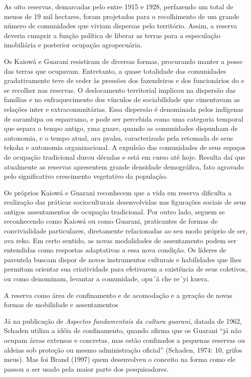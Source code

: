 As oito reservas, demarcadas pelo  entre 1915 e 1928, perfazendo um
total de menos de 19 mil hectares, foram projetadas para o recolhimento
de um grande número de comunidades que viviam dispersas pelo
território. Assim, a reserva deveria cumprir a função política de
liberar as terras para a especulação imobiliária e posterior ocupação
agropecuária. 

Os Kaiowá e Guarani resistiram de diversas formas, procurando manter a
posse das terras que ocupavam. Entretanto, a quase totalidade das
comunidades gradativamente teve de ceder às pressões dos fazendeiros e
dos funcionários do  e se recolher nas reservas. O deslocamento
territorial implicou na dispersão das famílias e no enfraquecimento dos
vínculos de sociabilidade que cimentavam as relações inter e
extracomunitárias. Essa dispersão é denominada pelos indígenas de
sarambipa ou esparramo, e pode ser percebida como uma categoria
temporal que separa o tempo antigo, yma guare, quando as comunidades
dispunham de autonomia, e o tempo atual, ara pyahu, caracterizado pela
retomada de seus tekoha e autonomia organizacional. A expulsão das
comunidades de seus espaços de ocupação tradicional durou décadas e
está em curso até hoje. Resulta daí que atualmente as reservas
apresentem grande densidade demográfica, fato agravado pelo
significativo crescimento vegetativo da população.

Os próprios Kaiowá e Guarani reconhecem que a vida em reserva dificulta
a realização das práticas socioculturais desenvolvidas nas figurações
sociais de seus antigos assentamentos de ocupação tradicional. Por
outro lado, seguem se reconhecendo como Kaiowá ou como Guarani,
praticantes de formas de convivialidade particulares, diretamente
relacionadas ao seu modo próprio de ser, ava reko. Em certo sentido, as
novas modalidades de assentamento podem ser entendidas como respostas
adaptativas a essa nova condição. Os líderes de parentela buscam dispor
de novos instrumentos culturais e habilidades que lhes permitam
orientar sua criatividade para efetivarem a existência de seus
coletivos, ou como denominam, levantar a comunidade, opu´ã che re´yi
kuera.

A reserva como área de confinamento e de acomodação e a geração de novas
formas de mobilidade e assentamentos

Já na publicação de \emph{Aspectos fundamentais da cultura guarani}, datada de
1962, Schaden utiliza a idéia de confinamento, quando afirma que os
Guarani ``já não ocupam áreas extensas e concretas, mas estão confinados
a pequenas reservas ou aldeias sob proteção ou mesmo administração
oficial'' (Schaden, 1974: 10, grifos meus). Mas foi Brand (1997) quem
desenvolveu o conceito na forma como ele passou a ser usado pela maior
parte dos pesquisadores.

